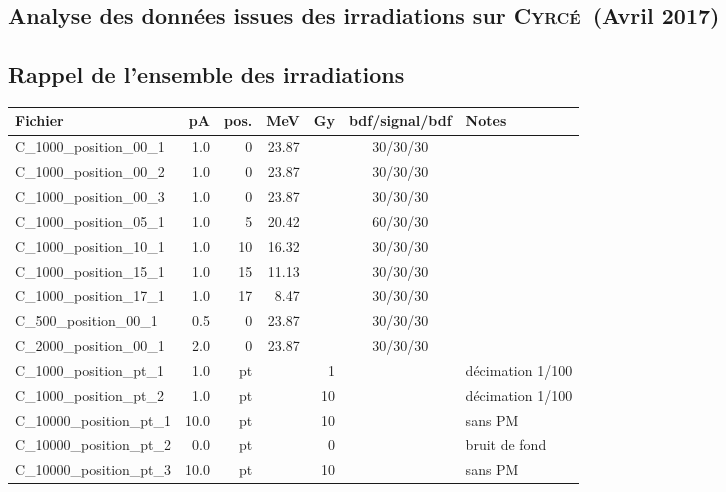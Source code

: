\documentclass[a4paper,11pt]{article}
\newcommand{\cyrce}{\textsc{Cyrcé}}
\begin{document}
\setmarginsrb{3.5cm}{1.5cm}{1.5cm}{2cm}{2ex}{3ex}{2ex}{5ex}
%
\lhead[]{}
\fancyfoot[C]{}
\fancyfoot[R]{\thepage}

\begin{center}
\subsection*{Analyse des données issues des irradiations sur \cyrce\ (Avril 2017)}
\end{center}

\subsection*{Rappel de l’ensemble des irradiations}
\begin{center}
\begin{tabular}{lrrrrcl}
Fichier&pA&pos.&MeV&Gy&bdf/signal/bdf&Notes\\
\hline
\hline
C\_1000\_position\_00\_1&1.0&0&23.87&&30/30/30&\\
C\_1000\_position\_00\_2&1.0&0&23.87&&30/30/30&\\
C\_1000\_position\_00\_3&1.0&0&23.87&&30/30/30&\\
C\_1000\_position\_05\_1&1.0&5&20.42&&60/30/30&\\
C\_1000\_position\_10\_1&1.0&10&16.32&&30/30/30&\\
C\_1000\_position\_15\_1&1.0&15&11.13&&30/30/30&\\
C\_1000\_position\_17\_1&1.0&17&8.47&&30/30/30&\\
C\_500\_position\_00\_1&0.5&0&23.87&&30/30/30&\\
C\_2000\_position\_00\_1&2.0&0&23.87&&30/30/30&\\
C\_1000\_position\_pt\_1&1.0&pt&&1&&décimation 1/100\\
C\_1000\_position\_pt\_2&1.0&pt&&10&&décimation 1/100\\
C\_10000\_position\_pt\_1&10.0&pt&&10&&sans PM\\
C\_10000\_position\_pt\_2&0.0&pt&&0&&bruit de fond\\
C\_10000\_position\_pt\_3&10.0&pt&&10&&sans PM\\
\hline
\end{tabular}
\end{center}
\end{document}
